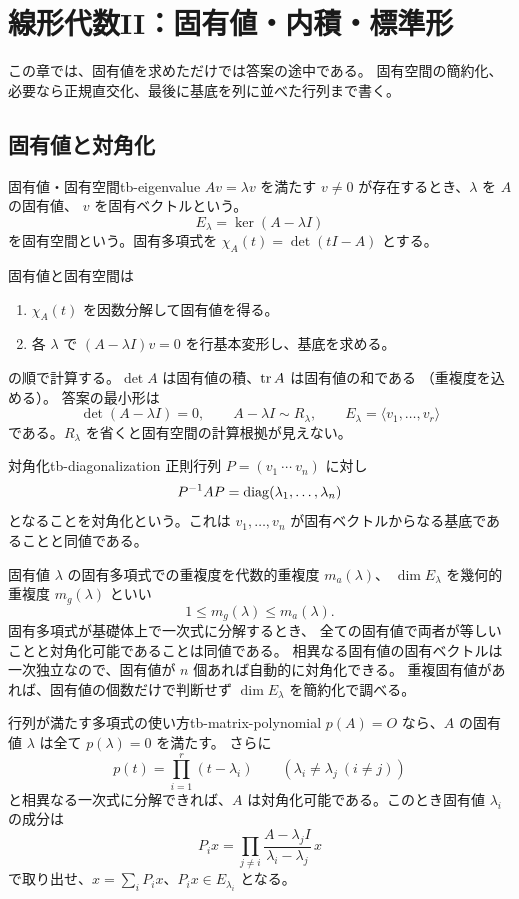 \chapter{線形代数II：固有値・内積・標準形}
\label{ch:tb-linear-two}

この章では、固有値を求めただけでは答案の途中である。
固有空間の簡約化、必要なら正規直交化、最後に基底を列に並べた行列まで書く。

\section{固有値と対角化}

\begin{definition}{固有値・固有空間}{tb-eigenvalue}
$Av=\lambda v$ を満たす $v\ne0$ が存在するとき、$\lambda$ を $A$ の固有値、
$v$ を固有ベクトルという。
\[
E_\lambda=\ker(A-\lambda I)
\]
を固有空間という。固有多項式を
$\chi_A(t)=\det(tI-A)$ とする。
\end{definition}

固有値と固有空間は
\begin{enumerate}
  \item $\chi_A(t)$ を因数分解して固有値を得る。
  \item 各 $\lambda$ で $(A-\lambda I)v=0$ を行基本変形し、基底を求める。
\end{enumerate}
の順で計算する。$\det A$ は固有値の積、$\operatorname{tr} A$ は固有値の和である
（重複度を込める）。
答案の最小形は
\[
\det(A-\lambda I)=0,\qquad
A-\lambda I\sim R_\lambda,\qquad
E_\lambda=\langle v_1,\ldots,v_r\rangle
\]
である。$R_\lambda$ を省くと固有空間の計算根拠が見えない。

\begin{definition}{対角化}{tb-diagonalization}
正則行列 $P=(v_1\ \cdots\ v_n)$ に対し
\[
P^{-1}AP=\operatorname{diag}(\lambda_1,\ldots,\lambda_n)
\]
となることを対角化という。これは $v_1,\ldots,v_n$ が固有ベクトルからなる基底であることと同値である。
\end{definition}

固有値 $\lambda$ の固有多項式での重複度を代数的重複度 $m_a(\lambda)$、
$\dim E_\lambda$ を幾何的重複度 $m_g(\lambda)$ といい
\[
1\le m_g(\lambda)\le m_a(\lambda).
\]
固有多項式が基礎体上で一次式に分解するとき、
全ての固有値で両者が等しいことと対角化可能であることは同値である。
相異なる固有値の固有ベクトルは一次独立なので、固有値が $n$ 個あれば自動的に対角化できる。
重複固有値があれば、固有値の個数だけで判断せず $\dim E_\lambda$ を簡約化で調べる。

\begin{proposition}{行列が満たす多項式の使い方}{tb-matrix-polynomial}
$p(A)=O$ なら、$A$ の固有値 $\lambda$ は全て $p(\lambda)=0$ を満たす。
さらに
\[
p(t)=\prod_{i=1}^r(t-\lambda_i)\qquad(\lambda_i\ne\lambda_j\ (i\ne j))
\]
と相異なる一次式に分解できれば、$A$ は対角化可能である。このとき固有値 $\lambda_i$ の成分は
\[
P_i x=\prod_{j\ne i}\frac{A-\lambda_jI}{\lambda_i-\lambda_j}\,x
\]
で取り出せ、$x=\sum_iP_ix$、$P_ix\in E_{\lambda_i}$ となる。
\end{proposition}


